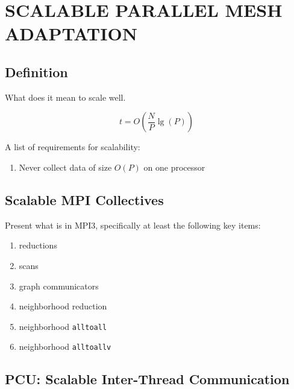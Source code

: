 
\chapter{SCALABLE PARALLEL MESH ADAPTATION}
\label{chap:parallel}

\section{Definition}

What does it mean to scale well.

\begin{equation} \label{eq:big-o-scale}
t = O\left(\frac{N}{P}\lg(P)\right)
\end{equation}

A list of requirements for scalability:

\begin{enumerate}
\item Never collect data of size $O(P)$ on one processor
\end{enumerate}

\section{Scalable MPI Collectives}
\label{sec:mpi3}

Present what is in MPI3, specifically at least the following key items:

\begin{enumerate}
\item reductions
\item scans
\item graph communicators
\item neighborhood reduction
\item neighborhood \texttt{alltoall}
\item neighborhood \texttt{alltoallv}
\end{enumerate}

\section{PCU: Scalable Inter-Thread Communication}
\label{sec:pcu}

